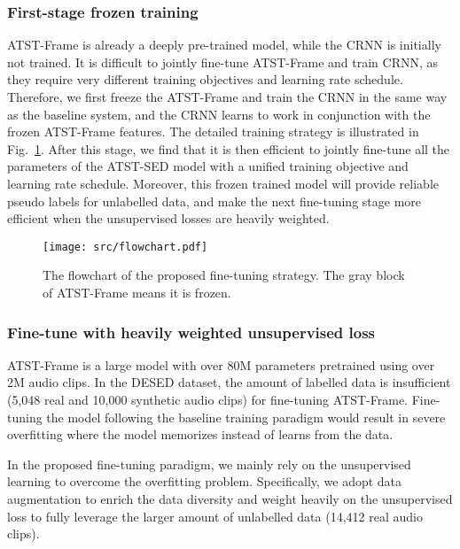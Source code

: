 \documentclass{article}
\begin{document}
\subsubsection{First-stage frozen training}
ATST-Frame is already a deeply pre-trained model, while the CRNN is initially not trained. It is difficult to jointly fine-tune ATST-Frame and train CRNN, as they require very different training objectives and learning rate schedule. Therefore, we first freeze the ATST-Frame and train the CRNN in the same way as the baseline system, and the CRNN learns to work in conjunction with the frozen ATST-Frame features. The detailed training strategy is illustrated in Fig.~\ref{fig: flowchart}.  After this stage, we find that it is then efficient to jointly fine-tune all the parameters of the ATST-SED model with a unified training objective and learning rate schedule. Moreover, this frozen trained model will provide reliable pseudo labels for unlabelled data, and make the next fine-tuning stage more efficient when the unsupervised losses are heavily weighted.

\begin{figure}[t]
\begin{minipage}[b]{1.0\linewidth}
  \centering
  \centerline{\texttt{[image: src/flowchart.pdf]}}
\end{minipage}
\caption{The flowchart of the proposed fine-tuning strategy. The gray block of ATST-Frame means it is frozen. 
}
\vspace{-1em}
\label{fig: flowchart}
\end{figure}


\subsubsection{Fine-tune with heavily weighted unsupervised loss}
\label{sec: heavy_weight_unsup}
ATST-Frame is a large model with over 80M parameters pretrained using over 2M audio clips. In the DESED dataset, the amount of labelled data is insufficient (5,048 real and 10,000 synthetic audio clips) for fine-tuning ATST-Frame. Fine-tuning the model following the baseline training paradigm would result in severe overfitting \cite{li2023self} where the model memorizes instead of learns from the data. 

In the proposed fine-tuning paradigm, we mainly rely on the unsupervised learning to overcome the overfitting problem. Specifically, we adopt data augmentation to enrich the data diversity and weight heavily on the unsupervised loss to fully leverage the larger amount of unlabelled data (14,412 real audio clips). 
\end{document}
